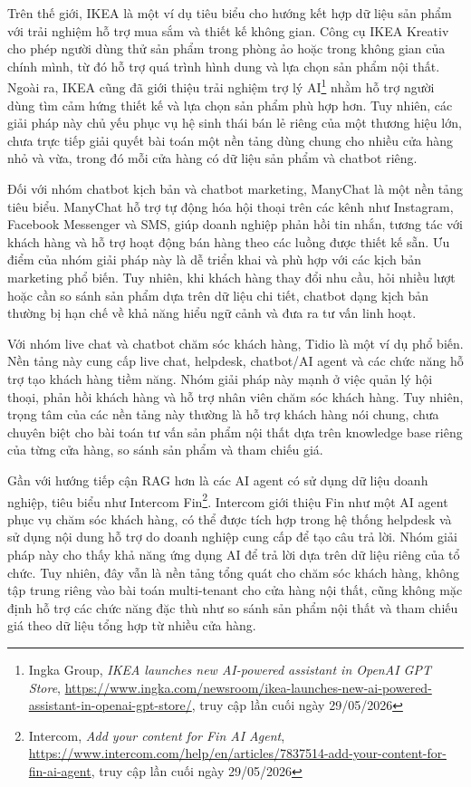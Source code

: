 \documentclass[../DoAn.tex]{subfiles}
\begin{document}
Trên thế giới, IKEA là một ví dụ tiêu biểu cho hướng kết hợp dữ liệu sản phẩm với trải nghiệm hỗ trợ mua sắm và thiết kế không gian. Công cụ IKEA Kreativ cho phép người dùng thử sản phẩm trong phòng ảo hoặc trong không gian của chính mình, từ đó hỗ trợ quá trình hình dung và lựa chọn sản phẩm nội thất. Ngoài ra, IKEA cũng đã giới thiệu trải nghiệm trợ lý AI\footnote{Ingka Group, \textit{IKEA launches new AI-powered assistant in OpenAI GPT Store}, \url{https://www.ingka.com/newsroom/ikea-launches-new-ai-powered-assistant-in-openai-gpt-store/}, truy cập lần cuối ngày 29/05/2026} nhằm hỗ trợ người dùng tìm cảm hứng thiết kế và lựa chọn sản phẩm phù hợp hơn. Tuy nhiên, các giải pháp này chủ yếu phục vụ hệ sinh thái bán lẻ riêng của một thương hiệu lớn, chưa trực tiếp giải quyết bài toán một nền tảng dùng chung cho nhiều cửa hàng nhỏ và vừa, trong đó mỗi cửa hàng có dữ liệu sản phẩm và chatbot riêng.

Đối với nhóm chatbot kịch bản và chatbot marketing, ManyChat là một nền tảng tiêu biểu. ManyChat hỗ trợ tự động hóa hội thoại trên các kênh như Instagram, Facebook Messenger và SMS, giúp doanh nghiệp phản hồi tin nhắn, tương tác với khách hàng và hỗ trợ hoạt động bán hàng theo các luồng được thiết kế sẵn. Ưu điểm của nhóm giải pháp này là dễ triển khai và phù hợp với các kịch bản marketing phổ biến. Tuy nhiên, khi khách hàng thay đổi nhu cầu, hỏi nhiều lượt hoặc cần so sánh sản phẩm dựa trên dữ liệu chi tiết, chatbot dạng kịch bản thường bị hạn chế về khả năng hiểu ngữ cảnh và đưa ra tư vấn linh hoạt.

Với nhóm live chat và chatbot chăm sóc khách hàng, Tidio là một ví dụ phổ biến. Nền tảng này cung cấp live chat, helpdesk, chatbot/AI agent và các chức năng hỗ trợ tạo khách hàng tiềm năng. Nhóm giải pháp này mạnh ở việc quản lý hội thoại, phản hồi khách hàng và hỗ trợ nhân viên chăm sóc khách hàng. Tuy nhiên, trọng tâm của các nền tảng này thường là hỗ trợ khách hàng nói chung, chưa chuyên biệt cho bài toán tư vấn sản phẩm nội thất dựa trên knowledge base riêng của từng cửa hàng, so sánh sản phẩm và tham chiếu giá.

Gần với hướng tiếp cận RAG hơn là các AI agent có sử dụng dữ liệu doanh nghiệp, tiêu biểu như Intercom Fin\footnote{Intercom, \textit{Add your content for Fin AI Agent}, \url{https://www.intercom.com/help/en/articles/7837514-add-your-content-for-fin-ai-agent}, truy cập lần cuối ngày 29/05/2026}. Intercom giới thiệu Fin như một AI agent phục vụ chăm sóc khách hàng, có thể được tích hợp trong hệ thống helpdesk và sử dụng nội dung hỗ trợ do doanh nghiệp cung cấp để tạo câu trả lời. Nhóm giải pháp này cho thấy khả năng ứng dụng AI để trả lời dựa trên dữ liệu riêng của tổ chức. Tuy nhiên, đây vẫn là nền tảng tổng quát cho chăm sóc khách hàng, không tập trung riêng vào bài toán multi-tenant cho cửa hàng nội thất, cũng không mặc định hỗ trợ các chức năng đặc thù như so sánh sản phẩm nội thất và tham chiếu giá theo dữ liệu tổng hợp từ nhiều cửa hàng.
\end{document}
